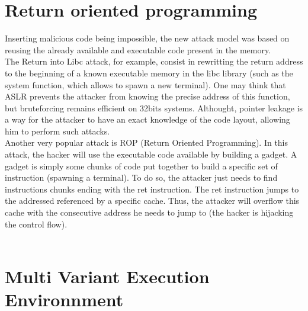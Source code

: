 \documentclass[english]{enstaPRE}
\begin{document}
\section{Return oriented programming}
Inserting malicious code being impossible, the new attack model was based on reusing the already available and executable code present
in the memory. \\ The Return into Libc attack, for example, consist in rewritting the return address to the beginning of a known
executable memory in the libc library (such as the system function, which allows to spawn a new terminal). One may think that ASLR
prevents the attacker from knowing the precise address of this function, but bruteforcing remains efficient on 32bits systems.
Althought, pointer leakage is a way for the attacker to have an exact knowledge of the code layout, allowing him to perform such attacks.
\\
Another very popular attack is ROP (Return Oriented Programming). In this attack, the hacker will use the executable code available 
by building a gadget. A gadget is simply some chunks of code put together to build a specific set of instruction (spawning a terminal).
To do so, the attacker just needs to find instructions chunks ending with the ret instruction. The ret instruction jumps to the addressed
referenced by a specific cache. Thus, the attacker will overflow this cache with the consecutive address he needs to jump to 
(the hacker is hijacking the control flow).
\\ \\

\section{Multi Variant Execution Environnment}
\end{document}
